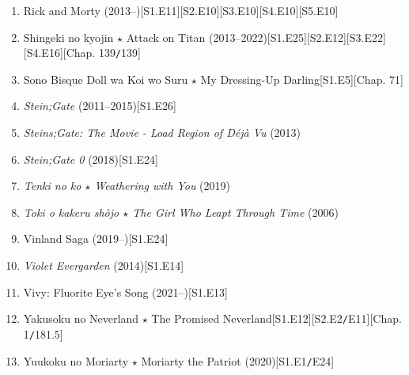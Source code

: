 \documentclass{article}
\begin{document}
\begin{enumerate}
    Rascal Does Not Dream of Bunny Girl Senpai (2018--)\hfill[S1.E14]
    \item Rick and Morty (2013--)\hfill[S1.E11][S2.E10][S3.E10][S4.E10][S5.E10]
    \item Shingeki no kyojin $\star$ Attack on Titan (2013--2022)\hfill[S1.E25][S2.E12][S3.E22][S4.E16][Chap. 139\texttt{/}139]
    \item Sono Bisque Doll wa Koi wo Suru $\star$ My Dressing-Up Darling\hfill[S1.E5][Chap. 71]
    \item \textit{Stein;Gate} (2011--2015)\hfill[S1.E26]
    \item \textit{Steins;Gate: The Movie - Load Region of Déjà Vu} (2013)
    \item \textit{Stein;Gate 0} (2018)\hfill[S1.E24]
    \item \textit{Tenki no ko $\star$ Weathering with You} (2019)
    \item \textit{Toki o kakeru sh\^ojo $\star$ The Girl Who Leapt Through Time} (2006)
    \item Vinland Saga (2019--)\hfill[S1.E24]
    \item \textit{Violet Evergarden} (2014)\hfill[S1.E14]
    \item Vivy: Fluorite Eye's Song (2021--)\hfill[S1.E13]
    \item Yakusoku no Neverland $\star$ The Promised Neverland\hfill[S1.E12][S2.E2\texttt{/}E11][Chap. 1\texttt{/}181.5]
    \item Yuukoku no Moriarty $\star$ Moriarty the Patriot (2020)\hfill[S1.E1\texttt{/}E24]
\end{enumerate}

\end{document}
